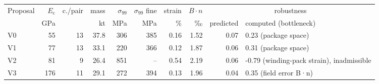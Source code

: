 \begin{tabular}{@{}lrrrrrrrrl@{}}\toprule
Proposal & $E_\text{c}$ & c./pair & mass & $\sigma_{99}$ & $\sigma_{99}$ fine & strain & $B\cdot n$ & \multicolumn{2}{c}{robustness} \\
 & GPa & & kt & MPa & MPa & \% & ‰ & predicted & computed (bottleneck) \\\midrule
V0 & \num{55} & 13 & \num{37.8} & \num{306} & \num{385} & \num{0.16} & \num{1.52} & 0.07 & 0.23 (package space) \\
V1 & \num{77} & 13 & \num{33.1} & \num{220} & \num{366} & \num{0.12} & \num{1.87} & 0.06 & 0.31 (package space) \\
V2 & \num{81} & 9 & \num{26.4} & \num{851} & -- & \num{0.54} & \num{2.19} & 0.06 & -0.79 (winding-pack strain), inadmissible \\
V3 & \num{176} & 11 & \num{29.1} & \num{272} & \num{394} & \num{0.13} & \num{1.96} & 0.04 & 0.35 (field error B·n) \\
\bottomrule\end{tabular}
